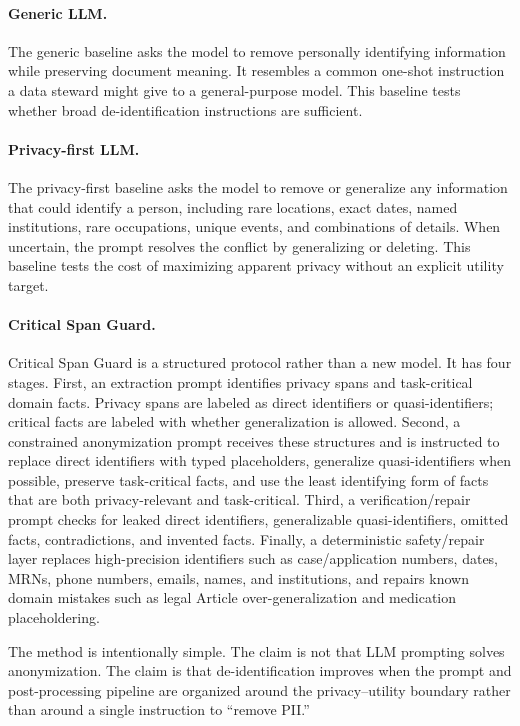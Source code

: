 \documentclass{article}
\newcommand{\method}{Critical Span Guard}
\begin{document}
\paragraph{Generic LLM.}
The generic baseline asks the model to remove personally identifying information
while preserving document meaning.  It resembles a common one-shot instruction a
data steward might give to a general-purpose model.  This baseline tests whether
broad de-identification instructions are sufficient.

\paragraph{Privacy-first LLM.}
The privacy-first baseline asks the model to remove or generalize any information
that could identify a person, including rare locations, exact dates, named
institutions, rare occupations, unique events, and combinations of details.  When
uncertain, the prompt resolves the conflict by generalizing or deleting.  This
baseline tests the cost of maximizing apparent privacy without an explicit
utility target.

\paragraph{\method.}
\method{} is a structured protocol rather than a new model.  It has four stages.
First, an extraction prompt identifies privacy spans and task-critical domain
facts.  Privacy spans are labeled as direct identifiers or quasi-identifiers;
critical facts are labeled with whether generalization is allowed.  Second, a
constrained anonymization prompt receives these structures and is instructed to
replace direct identifiers with typed placeholders, generalize quasi-identifiers
when possible, preserve task-critical facts, and use the least identifying form
of facts that are both privacy-relevant and task-critical.  Third, a
verification/repair prompt checks for leaked direct identifiers, generalizable
quasi-identifiers, omitted facts, contradictions, and invented facts.  Finally, a
deterministic safety/repair layer replaces high-precision identifiers such as
case/application numbers, dates, MRNs, phone numbers, emails, names, and
institutions, and repairs known domain mistakes such as legal Article
over-generalization and medication placeholdering.

The method is intentionally simple.  The claim is not that LLM prompting solves
anonymization.  The claim is that de-identification improves when the prompt and
post-processing pipeline are organized around the privacy--utility boundary
rather than around a single instruction to ``remove PII.''
\end{document}
